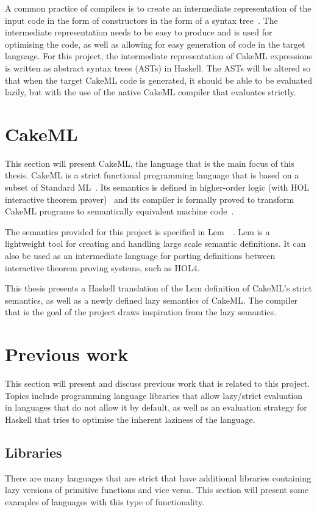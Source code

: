 A common practice of compilers is to create an intermediate representation of
the input code in the form of constructors in the form of a syntax
tree~\cite{DragonBook}. The intermediate representation needs to be
easy to produce and is used for optimising the code, as well as allowing for
easy generation of code in the target language.
For this project, the intermediate representation of CakeML expressions is %
written as abstract syntax trees (ASTs) in Haskell. The ASTs will be altered so
that when the target CakeML code is generated, it should be able to be evaluated
lazily, but with the use of the native CakeML compiler that evaluates strictly.

\section{CakeML}
\label{back:cakeml}
This section will present CakeML, the language that is the main focus of this
thesis. CakeML is a strict functional programming language that is based on a
subset of Standard ML~\cite{CakeML25:online}. Its semantics is defined in
higher-order logic (with HOL interactive theorem prover)~\cite{HOLInter57:online}
and its compiler is formally
proved to transform CakeML programs to semantically equivalent machine
code~\cite{Kumar:2014:CVI:2535838.2535841}.

The semantics provided for this project is specified in
Lem~\cite{Lem33:online}~\cite{LemPaper}. Lem is a lightweight tool for creating
and handling large scale semantic definitions. It can also be used as an
intermediate language for porting definitions between interactive theorem proving
systems, such as HOL4.

This thesis presents a Haskell translation of the Lem definition of CakeML's
strict semantics, as well as a newly defined lazy semantics of CakeML. The
compiler that is the goal of the project draws inspiration from the lazy
semantics.

\section{Previous work}
This section will present and discuss previous work that is related to this
project. Topics include programming language libraries that allow lazy/strict
evaluation in languages that do not allow it by default, as well as an
evaluation strategy for Haskell that tries to optimise the inherent laziness
of the language.

\subsection{Libraries}
There are many languages that are strict that have additional libraries
containing lazy versions of primitive functions and vice versa. This section
will present some examples of languages with this type of functionality.

